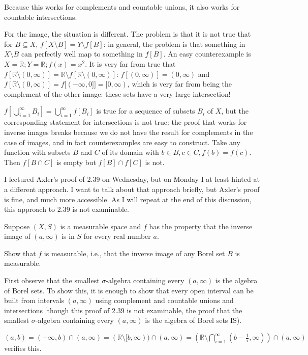 \documentclass[12pt]{article}
\begin{document}
Because this works for complements and countable unions, it also works for countable intersections.

For the image, the situation is different.  The problem is that it is not true that for $B \subseteq X$, $f[X \setminus B] = Y \setminus f[B]$: in general, the problem is that something in $X \setminus B$ can perfectly well map to something in $f[B]$.  An easy counterexample is $X = \mathbb R; Y = \mathbb R; f(x) = x^2$.  It is very far from true that
$f[\mathbb R \setminus (0,\infty)] = \mathbb R \setminus f[\mathbb R \setminus (0,\infty)]$:  $f[(0,\infty)] = (0,\infty)$ and $f[\mathbb R \setminus (0,\infty)]=f[(-\infty,0]] = [0,\infty)$, which is very far from being the complement of the other image:  these sets have a very large intersection!

$f[\bigcup_{i=1}^\infty B_i] = \bigcup_{i=1}^\infty f[B_i]$ is true for a sequence of subsets $B_i$ of $X$, but the corresponding statement for intersections is not true:  the proof that works for inverse images breaks because we do not have the result for complements in the case of images, and in fact counterexamples are easy to construct.  Take any function with subsets $B$ and $C$ of its
domain with $b \in B, c \in C, f(b)=f(c)$.  Then $f[B \cap C]$ is empty but $f[B] \cap f[C]$ is not.

I lectured Axler's proof of 2.39 on Wednesday, but on Monday I at least hinted at a different approach.  I want to talk about that approach briefly, but Axler's proof is fine, and much  more accessible.  As I will repeat at the end of this discussion, this approach to 2.39 is not examinable.

Suppose $(X,S)$ is a measurable space and $f$ has the property that the inverse image of $(a,\infty)$ is in $S$ for every real number $a$.

Show that $f$ is measurable, i.e., that the inverse image of any Borel set $B$ is measurable.

First observe that the smallest $\sigma$-algebra containing every $(a,\infty)$ is the algebra of Borel sets.  To show this, it is enough to show that every
open interval can be built from intervals $(a,\infty)$ using complement and countable unions and intersections [though this proof of 2.39 is not examinable, the proof that  the smallest $\sigma$-algebra containing every $(a,\infty)$ is the algebra of Borel sets IS).

$(a,b) = (-\infty,b) \cap (a,\infty) = (\mathbb R \setminus [b,\infty)) \cap (a,\infty) = (\mathbb R \setminus \bigcap_{i=1}^\infty (b-\frac1i,\infty))\cap (a,\infty)$ verifies this.
\end{document}
